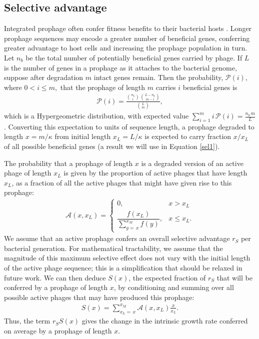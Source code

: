\subsection{Selective advantage} \label{sel}
Integrated prophage often confer fitness benefits to their bacterial hosts \citep{bondy-denomy_when_2014}. Longer prophage sequences may encode a greater number of beneficial genes, conferring greater advantage to host cells and increasing the prophage population in turn. Let $n_b$ be the total number of potentially beneficial genes carried by phage. If $L$ is the number of genes in a prophage as it attaches to the bacterial genome, suppose after degradation $m$ intact genes remain. Then the probability, $\mathcal{P}(i),$ where $0< i \leq m,$ that the prophage of length $m$ carries  $i$ beneficial genes is 
\begin{eqnarray}
\mathcal{P}(i)= \frac{\binom{n_b}{i}\,\binom{L-n_b}{m-i}}{\binom{L}{m}}\nonumber,
\end{eqnarray}
which is a Hypergeometric distribution, with expected value $\sum_{i = 1}^{m}  i \,\mathcal{P}(i) = \frac{ n_b\,m}{L}$.  Converting this expectation to units of sequence length, a prophage degraded to length $x = m/\kappa$ from initial length $x_L = L/\kappa$ is expected to carry fraction $x/x_L$ of all possible beneficial genes (a result we will use in Equation \ref{sel1}). 


The probability that a prophage of length $x$ is a degraded version of an active phage of length $x_L$ is given by the proportion of active phages that have length $x_L$, as a fraction of all the active phages that might have given rise to this prophage:
\begin{eqnarray}\label{s1}
\mathcal{A}(x, x_L) = \begin{cases} 
0, & x > x_{L} \\
\dfrac{f(x_{L})}{\sum\limits_{y = \,x}^{x_{M}}f(y)},  & x \leq x_{L}.
\end{cases}
\end{eqnarray}
We assume that an active prophage confers an overall selective advantage $r_S$ per bacterial generation.  For mathematical tractability, we assume that the magnitude of this maximum selective effect does not vary with the initial length of the active phage sequence; this is a simplification that should be relaxed in future work.
We can then deduce $S(x)$, the expected fraction of $r_S$ that will be conferred by a prophage of length $x$, by conditioning and summing over all possible active phages that may have produced this prophage:
\begin{eqnarray}
\label{sel1}
S(x) = \sum\limits_{x_{L}=\,x}^{x_{M}} \mathcal{A}(x, x_{L})\frac{x}{x_{L}}.
\end{eqnarray}
Thus, the term $r_S S(x)$ gives the change in the intrinsic growth rate conferred on average by a prophage of length $x$.

